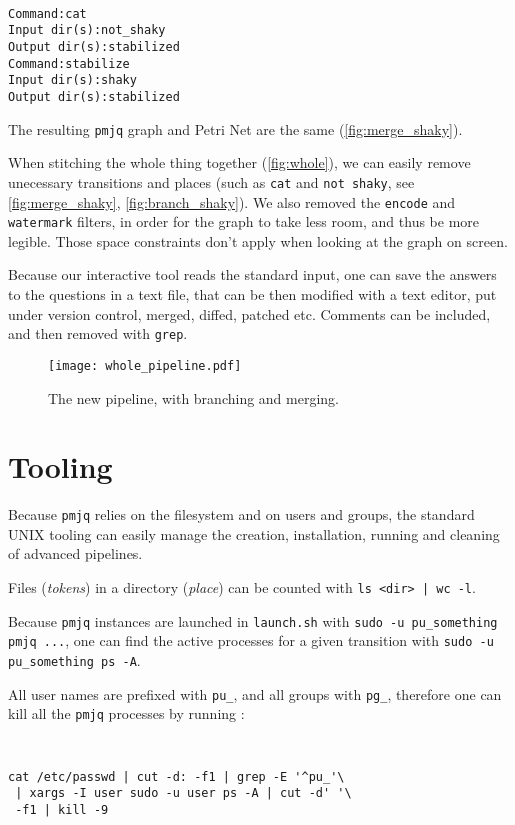 \documentclass[letterpaper,twocolumn,10pt]{article}
\begin{document}
{\tt \small
\begin{verbatim}
Command:cat
Input dir(s):not_shaky
Output dir(s):stabilized
Command:stabilize
Input dir(s):shaky
Output dir(s):stabilized
\end{verbatim}
}

The resulting {\tt pmjq} graph and Petri Net are the same (\autoref{fig:merge_shaky}).

When stitching the whole thing together (\autoref{fig:whole}), we can easily remove unecessary transitions and places (such as {\tt cat} and {\tt not shaky}, see \autoref{fig:merge_shaky}, \ref{fig:branch_shaky}). We also removed the {\tt encode} and {\tt watermark} filters, in order for the graph to take less room, and thus be more legible. Those space constraints don't apply when looking at the graph on screen.

Because our interactive tool reads the standard input, one can save the answers to the questions in a text file, that can be then modified with a text editor, put under version control, merged, diffed, patched etc. Comments can be included, and then removed with {\tt grep}.

\begin{figure}[t]
\begin{center}
\texttt{[image: whole\_pipeline.pdf]}
\end{center}
\caption{The new pipeline, with branching and merging.}
\label{fig:whole}
\end{figure}



\section{Tooling}
Because {\tt pmjq} relies on the filesystem and on users and groups, the standard UNIX tooling can easily manage the creation, installation, running and cleaning of advanced pipelines.

Files (\emph{tokens}) in a directory (\emph{place}) can be counted with {\tt ls <dir> | wc -l}.

Because {\tt pmjq} instances are launched in {\tt launch.sh} with {\tt sudo -u pu\_something pmjq ...}, one can find the active processes for a given transition with {\tt sudo -u pu\_something ps -A}.

All user names are prefixed with {\tt pu\_}, and all groups with {\tt pg\_}, therefore one can kill all the {\tt pmjq} processes by running :
{\tt \small
\begin{verbatim}
cat /etc/passwd | cut -d: -f1 | grep -E '^pu_'\
 | xargs -I user sudo -u user ps -A | cut -d' '\
 -f1 | kill -9
\end{verbatim}
}
\end{document}
